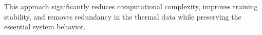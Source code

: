 This approach significantly reduces computational complexity, improves training stability, and removes redundancy in the thermal data while preserving the essential system behavior.









